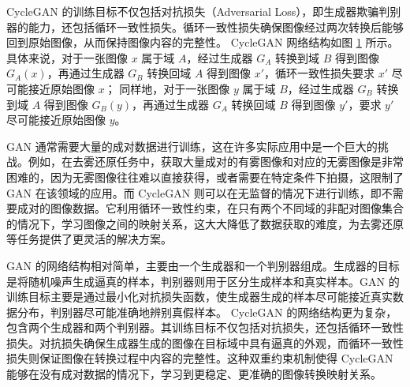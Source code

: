 CycleGAN 的训练目标不仅包括对抗损失（Adversarial Loss），即生成器欺骗判别器的能力，还包括循环一致性损失。循环一致性损失确保图像经过两次转换后能够回到原始图像，从而保持图像内容的完整性。
CycleGAN 网络结构如图 \ref{fig:cgan} 所示。具体来说，对于一张图像 $x$ 属于域 $A$，经过生成器 $G_A$ 转换到域 $B$ 得到图像 $G_A(x)$，再通过生成器 $G_B$ 转换回域 $A$ 得到图像 $x'$，循环一致性损失要求 $x'$ 尽可能接近原始图像 $x$；
同样地，对于一张图像 $y$ 属于域 $B$，经过生成器 $G_B$ 转换到域 $A$ 得到图像 $G_B(y)$，再通过生成器 $G_A$ 转换回域 $B$ 得到图像 $y'$，要求 $y'$ 尽可能接近原始图像 $y$。


\begin{figure}[htb]
    \centering
    \captionsetup{font=footnotesize}
    \label{fig:cgan}
\end{figure}

GAN 通常需要大量的成对数据进行训练，这在许多实际应用中是一个巨大的挑战。例如，在去雾还原任务中，获取大量成对的有雾图像和对应的无雾图像是非常困难的，因为无雾图像往往难以直接获得，或者需要在特定条件下拍摄，这限制了 GAN 在该领域的应用。而 CycleGAN 则可以在无监督的情况下进行训练，即不需要成对的图像数据。它利用循环一致性约束，在只有两个不同域的非配对图像集合的情况下，学习图像之间的映射关系，这大大降低了数据获取的难度，为去雾还原等任务提供了更灵活的解决方案。

GAN 的网络结构相对简单，主要由一个生成器和一个判别器组成。生成器的目标是将随机噪声生成逼真的样本，判别器则用于区分生成样本和真实样本。GAN 的训练目标主要是通过最小化对抗损失函数，使生成器生成的样本尽可能接近真实数据分布，判别器尽可能准确地辨别真假样本。
CycleGAN 的网络结构更为复杂，包含两个生成器和两个判别器。其训练目标不仅包括对抗损失，还包括循环一致性损失。对抗损失确保生成器生成的图像在目标域中具有逼真的外观，而循环一致性损失则保证图像在转换过程中内容的完整性。这种双重约束机制使得 CycleGAN 能够在没有成对数据的情况下，学习到更稳定、更准确的图像转换映射关系。

